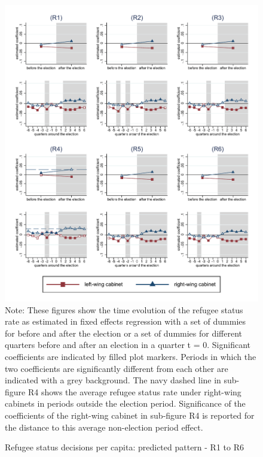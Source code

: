 \documentclass[11pt,a4paper]{scrartcl}
\begin{document}
\clearpage
\FloatBarrier
\begin{figure}[!ht]
	\caption{Refugee status decisions per capita: predicted pattern - R1 to R6}
	\includegraphics[width=1\textwidth]{../results/decisions/refugeestatus_rate_graphs_R1-R6.pdf}
	\scriptsize{Note: These figures show the time evolution of the refugee status rate as estimated in fixed effects regression with a set of dummies for before and after the election or a set of dummies for different quarters before and after an election in a quarter t = 0. Significant coefficients are indicated by filled plot markers. Periods in which the two coefficients are significantly different from each other are indicated with a grey background. The navy dashed line in sub-figure R4 shows the average refugee status rate under right-wing cabinets in periods outside the election period. Significance of the coefficients of the right-wing cabinet in sub-figure R4 is reported for the distance to this average non-election period effect.}
\end{figure}

%
%
%
%
%
%
%
%
\end{document}
